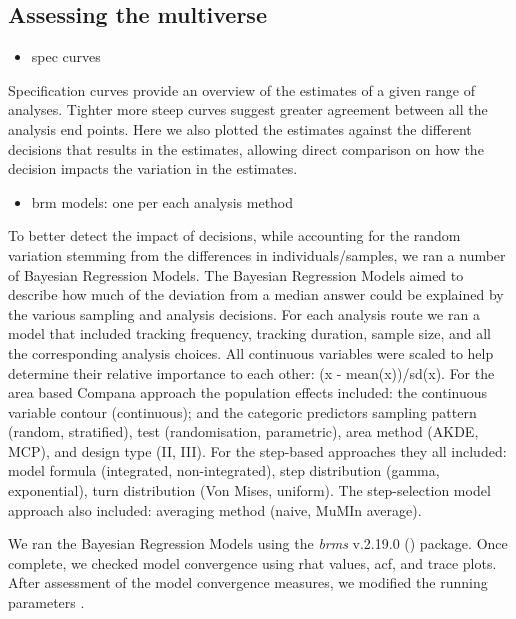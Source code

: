 \documentclass[10pt,a4paper]{article}
\providecommand{\tightlist}{%
  \setlength{\itemsep}{0pt}\setlength{\parskip}{0pt}}
\begin{document}
\subsection{Assessing the multiverse}\label{assessing-the-multiverse}

\begin{itemize}
\tightlist
\item
  spec curves
\end{itemize}

Specification curves provide an overview of the estimates of a given range of analyses.
Tighter more steep curves suggest greater agreement between all the analysis end points.
Here we also plotted the estimates against the different decisions that results in the estimates, allowing direct comparison on how the decision impacts the variation in the estimates.

\begin{itemize}
\tightlist
\item
  brm models: one per each analysis method
\end{itemize}

To better detect the impact of decisions, while accounting for the random variation stemming from the differences in individuals/samples, we ran a number of Bayesian Regression Models.
The Bayesian Regression Models aimed to describe how much of the deviation from a median answer could be explained by the various sampling and analysis decisions.
For each analysis route we ran a model that included tracking frequency, tracking duration, sample size, and all the corresponding analysis choices.
All continuous variables were scaled to help determine their relative importance to each other: (x - mean(x))/sd(x).
For the area based Compana approach the population effects included: the continuous variable contour (continuous); and the categoric predictors sampling pattern (random, stratified), test (randomisation, parametric), area method (AKDE, MCP), and design type (II, III).
For the step-based approaches they all included: model formula (integrated, non-integrated), step distribution (gamma, exponential), turn distribution (Von Mises, uniform).
The step-selection model approach also included: averaging method (naive, MuMIn average).

We ran the Bayesian Regression Models using the \emph{brms} v.2.19.0 () package.
Once complete, we checked model convergence using rhat values, acf, and trace plots.
After assessment of the model convergence measures, we modified the running parameters .
\end{document}
